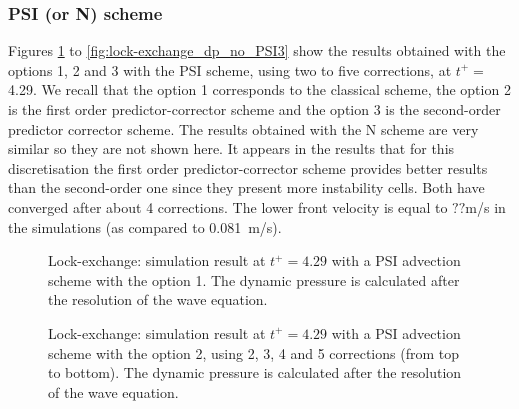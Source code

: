 \subsubsection{PSI (or N) scheme}
Figures \ref{fig:lock-exchange_dp_no_PSI1} to \ref{fig:lock-exchange_dp_no_PSI3}
show the results
obtained with the options 1, 2 and 3 with the PSI scheme, using two to five
corrections, at $t^+=$ 4.29.
We recall that the option 1 corresponds to the classical scheme, the option 2 is
the first order predictor-corrector
scheme and the option 3 is the second-order predictor corrector scheme.
The results obtained with the N scheme are very similar so they are not shown here.
It appears in the results that for this discretisation the first order predictor-corrector scheme
provides better results than the second-order one since they present more instability cells.
Both have converged after about 4 corrections.
The lower front velocity is equal to $??$m/s in the simulations (as compared to 0.081~m/s).
\begin{figure}[ht]
  \begin{center}
    \caption{Lock-exchange: simulation result at $t^+=4.29$ with a PSI advection scheme with the option 1.
      The dynamic pressure is calculated after the resolution of the wave equation.}
    \label{fig:lock-exchange_dp_no_PSI1}
  \end{center}
\end{figure}
\begin{figure}[ht]
  \begin{center}
    \caption{Lock-exchange: simulation result at $t^+=4.29$ with a PSI advection scheme with the option 2,
      using 2, 3, 4 and 5 corrections (from top to bottom).
      The dynamic pressure is calculated after the resolution of the wave equation.}
    \label{fig:lock-exchange_dp_no_PSI2}
  \end{center}
\end{figure}

